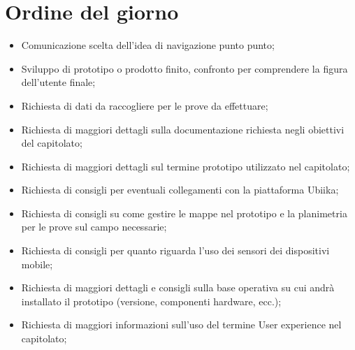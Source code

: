 \documentclass[../template.tex]{subfiles}
\begin{document}
\section{Ordine del giorno}
\begin{itemize}
	\item Comunicazione scelta dell'idea di navigazione punto punto;
	\item Sviluppo di prototipo o prodotto finito, confronto per comprendere la figura dell'utente finale;
	\item Richiesta di dati da raccogliere per le prove da effettuare;
	\item Richiesta di maggiori dettagli sulla documentazione richiesta negli obiettivi del capitolato;
	\item Richiesta di maggiori dettagli sul termine prototipo utilizzato nel capitolato;
	\item Richiesta di consigli per eventuali collegamenti con la piattaforma Ubiika;
	\item Richiesta di consigli su come gestire le mappe nel prototipo e la planimetria per le prove sul campo necessarie;
	\item Richiesta di consigli per quanto riguarda l'uso dei sensori dei dispositivi mobile;
	\item Richiesta di maggiori dettagli e consigli sulla base operativa su cui andrà installato il prototipo (versione, componenti hardware, ecc.);
	\item Richiesta di maggiori informazioni sull'uso del termine User experience nel capitolato;
\end{itemize}
\end{document}
